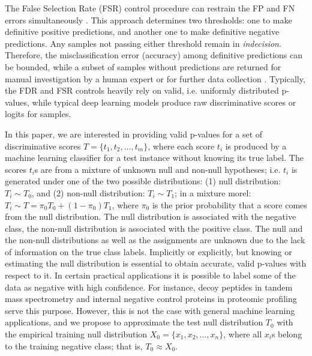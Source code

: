 \documentclass{article}
\newcommand{\edit}[1]{{\color{red}#1}}
\begin{document}
The False Selection Rate (FSR) control procedure can restrain the FP and FN errors simultaneously \cite{zhao2023controlling}. This approach determines two thresholds: one to make definitive positive predictions, and another one to make definitive negative predictions. Any samples not passing either threshold remain in {\em indecision}. Therefore, the misclassification error (accuracy) among definitive predictions can be bounded, while a subset of samples without predictions are returned for manual investigation by a human expert or for further data collection \cite{rava2021burden}. Typically, the FDR and FSR controls heavily rely on valid, i.e. uniformly distributed p-values, while typical deep learning models produce raw discriminative scores or logits for samples. 

\edit{In this paper, we are interested in providing valid p-values for a set of discriminative scores $T=\{t_1, t_2, \dots, t_m\}$, where each score $t_i$ is produced by a machine learning classifier for a test instance without knowing its true label. The scores $t_i$s are from a mixture of unknown null and non-null hypotheses; i.e. $t_i$ is generated under one of the two possible distributions: (1) null distribution: $T_i\sim T_0$, and (2) non-null distribution: $T_i\sim T_1$; in a mixture morel: $T_i\sim T=\pi_0 T_0 + (1-\pi_0)T_1$, where $\pi_0$ is the prior probability that a score comes from the null distribution. The null distribution is associated with the negative class, the non-null distribution is associated with the positive class. The null and the non-null distributions as well as the assignments are unknown due to the lack of information on the true class labels. Implicitly or explicitly, but knowing or estimating the null distribution is essential to obtain accurate, valid p-values with respect to it. In certain practical applications it is possible to label some of the data as negative with high confidence. For instance, decoy peptides\cite{elias2007target} in tandem mass spectrometry and internal negative control proteins \cite{gao2023simultaneous} in proteomic profiling serve this purpose. However, this is not the case with general machine learning applications, and we propose to approximate the test null distribution $T_0$ with the empirical training null distribution $X_0 = \{x_1, x_2, \dots, x_n\}$, where all $x_i$s belong to the training negative class; that is, $T_0 \approx X_0 $.}
  
\end{document}
